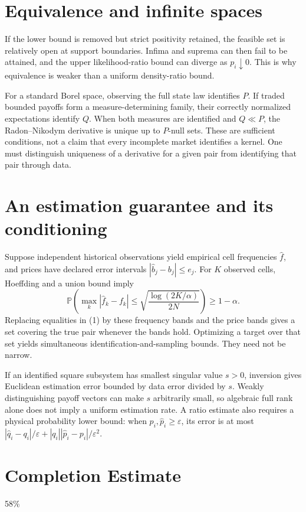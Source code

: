 \documentclass[11pt]{article}
\newcommand{\Prb}{\mathbb P}
\begin{document}
\section*{Equivalence and infinite spaces}
If the lower bound is removed but strict positivity retained, the feasible set is relatively open at support boundaries. Infima and suprema can then fail to be attained, and the upper likelihood-ratio bound can diverge as $p_i\downarrow0$. This is why equivalence is weaker than a uniform density-ratio bound.

For a standard Borel space, observing the full state law identifies $P$. If traded bounded payoffs form a measure-determining family, their correctly normalized expectations identify $Q$. When both measures are identified and $Q\ll P$, the Radon--Nikodym derivative is unique up to $P$-null sets. These are sufficient conditions, not a claim that every incomplete market identifies a kernel. One must distinguish uniqueness of a derivative for a given pair from identifying that pair through data.

\section*{An estimation guarantee and its conditioning}
Suppose independent historical observations yield empirical cell frequencies $\widehat f$, and prices have declared error intervals $|\widehat b_j-b_j|\leq e_j$. For $K$ observed cells, Hoeffding and a union bound imply
\[
 \Prb\left(\max_k|\widehat f_k-f_k|\leq
 \sqrt{\frac{\log(2K/\alpha)}{2N}}\right)\geq1-\alpha.
\]
Replacing equalities in (1) by these frequency bands and the price bands gives a set covering the true pair whenever the bands hold. Optimizing a target over that set yields simultaneous identification-and-sampling bounds. They need not be narrow.

If an identified square subsystem has smallest singular value $s>0$, inversion gives Euclidean estimation error bounded by data error divided by $s$. Weakly distinguishing payoff vectors can make $s$ arbitrarily small, so algebraic full rank alone does not imply a uniform estimation rate. A ratio estimate also requires a physical probability lower bound: when $p_i,\widehat p_i\geq\varepsilon$, its error is at most $|\widehat q_i-q_i|/\varepsilon+|q_i||\widehat p_i-p_i|/\varepsilon^2$.

\section{Completion Estimate}
58\%
\end{document}
